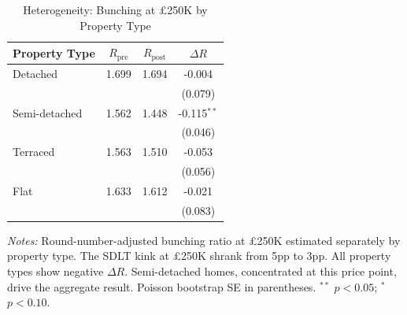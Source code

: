 \begin{table}[htbp]
\centering
\caption{Heterogeneity: Bunching at \pounds 250K by Property Type}
\label{tab:heterogeneity}
\begin{tabular}{lccc}
\hline\hline
Property Type & $R_{\text{pre}}$ & $R_{\text{post}}$ & $\Delta R$ \\
\hline
Detached & 1.699 & 1.694 & -0.004 \\
 & & & (0.079) \\
Semi-detached & 1.562 & 1.448 & -0.115$^{**}$ \\
 & & & (0.046) \\
Terraced & 1.563 & 1.510 & -0.053 \\
 & & & (0.056) \\
Flat & 1.633 & 1.612 & -0.021 \\
 & & & (0.083) \\
\hline\hline
\end{tabular}
\begin{tablenotes}
\item \textit{Notes:} Round-number-adjusted bunching ratio at \pounds 250K estimated separately by property type. The SDLT kink at \pounds 250K shrank from 5pp to 3pp. All property types show negative $\Delta R$. Semi-detached homes, concentrated at this price point, drive the aggregate result. Poisson bootstrap SE in parentheses. $^{**}$ $p < 0.05$; $^{*}$ $p < 0.10$.
\end{tablenotes}
\end{table}
